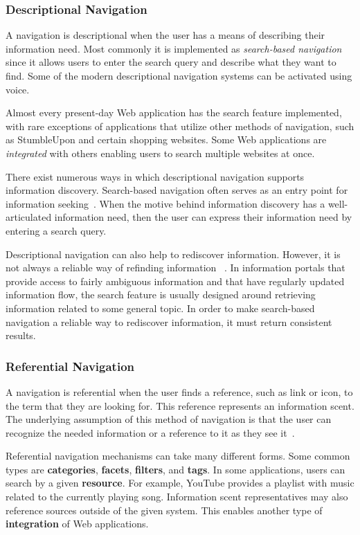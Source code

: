 {{{\subsubsection{Descriptional Navigation}
A navigation is descriptional when the user has a means of describing their information need. Most commonly it is implemented as \textit{search-based navigation} since it allows users to enter the search query and describe what they want to find. Some of the modern descriptional navigation systems can be activated using voice. 

Almost every present-day Web application has the search feature implemented, with rare exceptions of applications that utilize other methods of navigation, such as StumbleUpon and certain shopping websites. Some Web applications are \textit{integrated} with others enabling users to search multiple websites at once.    

There exist numerous ways in which descriptional navigation supports information discovery. Search-based navigation often serves as an entry point for information seeking~\cite{levene2011introduction}. When the motive behind information discovery has a well-articulated information need, then the user can express their information need by entering a search query. 

Descriptional navigation can also help to rediscover information. However, it is not always a reliable way of refinding information ~\cite{cockburn2003improving}. In information portals that provide access to fairly ambiguous information and that have regularly updated information flow, the search feature is usually designed around retrieving information related to some general topic. In order to make search-based navigation a reliable way to rediscover information, it must return consistent results. 
} %

{\subsubsection{Referential Navigation}
A navigation is referential when the user finds a reference, such as link or icon, to the term that they are looking for. This reference represents an information scent. The underlying assumption of this method of navigation is that the user can recognize the needed information or a reference to it as they see it~\cite{waterworth1991model}. 

Referential navigation mechanisms can take many different forms. Some common types are \textbf{categories}, \textbf{facets}, \textbf{filters}, and \textbf{tags}. In some applications, users can search by a given \textbf{resource}. For example, YouTube provides a playlist with music related to the currently playing song. Information scent representatives may also reference sources outside of the given system. This enables another type of \textbf{integration} of Web applications. 

}}}
